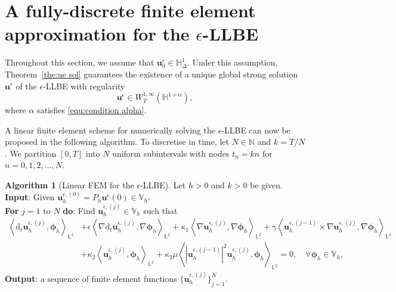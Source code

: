 \documentclass[11pt,reqno]{amsart}
\theoremstyle{definition}
\newtheorem{algorithm}[theorem]{Algorithm}
\numberwithin{equation}{section}
\newcommand{\bff}{\boldsymbol}
\newcommand{\bb}{\mathbb}
\newcommand{\nn}{\nonumber}
\newcommand{\inpro}[2]{\left\langle#1,#2\right\rangle}
\begin{document}
\section{A fully-discrete finite element approximation for the $\epsilon$-LLBE} \label{sec:fem}
Throughout this section, we assume that $\bff{u}_0^\epsilon \in \bb{H}^1_\Delta$. Under this assumption, Theorem~\ref{the:ue sol} guarantees the existence of a unique global strong solution $\bff{u}^\epsilon$ of the $\epsilon$-LLBE with regularity
\begin{equation}\label{equ:regularity llbe}
\bff{u}^\epsilon\in W^{1,\infty}_T(\bb{H}^{1+\alpha}),
\end{equation}
where $\alpha$ satisfies \eqref{equ:condition alpha}.


A linear finite element scheme for numerically solving the $\epsilon$-LLBE
can now be proposed in the following algorithm. To discretise in time, let $N\in\bb{N}$ and $k=T/N$. We
partition $[0,T]$ into $N$ uniform subintervals with nodes $t_n=kn$ for $n=0,1,2,\ldots,N$. 

\begin{algorithm}[Linear FEM for the $\epsilon$-LLBE]\label{alg:fem eps llbe}
{Let $h>0$ and $k>0$ be given.
\\
\textbf{Input}: Given $\bff{u}_h^{\epsilon, (0)}= P_h \bff{u}^\epsilon(0)\in \bb{V}_h$.
\\
\textbf{For} $j=1$ to $N$ \textbf{do}: Find $\bff{u}_h^{\epsilon, (j)}\in\bb{V}_h$ such that 
\begin{align}\label{equ:dis1}
\inpro{\mathrm{d}_t\bff{u}_h^{\epsilon, (j)}}{\bff{\phi}_h}_{\bb{L}^2}
&+
\epsilon\inpro{\nabla \mathrm{d}_t\bff{u}_h^{\epsilon, (j)}}{\nabla\bff{\phi}_h}_{\bb{L}^2}
+
\kappa_1 \inpro{\nabla\bff{u}_h^{\epsilon, (j)}}{\nabla\bff{\phi}_h}_{\bb{L}^2}
+
\gamma \inpro{\bff{u}_h^{\epsilon, (j-1)}\times \nabla\bff{u}_h^{\epsilon, (j)}}{\nabla\bff{\phi}_h}_{\bb{L}^2}
\nn\\
&
+
\kappa_2 \inpro{\bff{u}_h^{\epsilon, (j)}}{\bff{\phi}_h}_{\bb{L}^2}
+
\kappa_2 \mu
\inpro{|\bff{u}_h^{\epsilon, (j-1)}|^2 \bff{u}_h^{\epsilon, (j)}}{\bff{\phi}_h}_{\bb{L}^2}
=0,
\quad\forall \bff{\phi}_h\in\bb{V}_h,
\end{align}
\textbf{Output}: a sequence of finite element functions $\big\{\bff{u}_h^{\epsilon, (j)}\big\}_{j=1}^N$.}
\end{algorithm}
\end{document}
